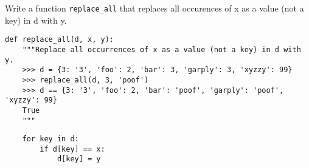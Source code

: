 \begin{blocksection}
    \question Write a function \texttt{replace\_all} that replaces all occurences of x as a value (not a key) in d with y.
\end{blocksection}

\begin{blocksection}
\begin{lstlisting}
def replace_all(d, x, y):
    """Replace all occurrences of x as a value (not a key) in d with y.
    >>> d = {3: '3', 'foo': 2, 'bar': 3, 'garply': 3, 'xyzzy': 99}
    >>> replace_all(d, 3, 'poof')
    >>> d == {3: '3', 'foo': 2, 'bar': 'poof', 'garply': 'poof', 'xyzzy': 99}
    True
    """
    \end{lstlisting}
    \begin{solution}[1in]
    \begin{lstlisting}
    for key in d:
        if d[key] == x:
            d[key] = y
    \end{lstlisting}
    \end{solution}
\end{blocksection}